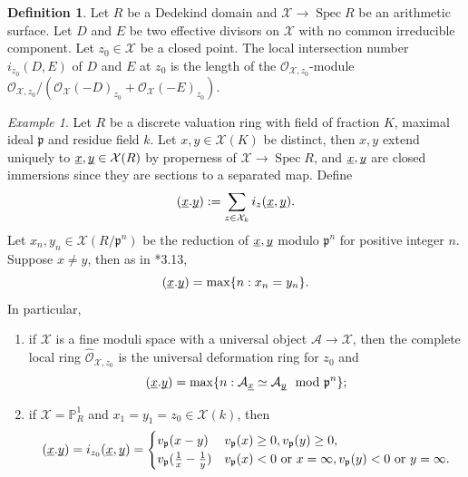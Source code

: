 \documentclass{amsart}
\numberwithin{equation}{subsection}
\numberwithin{theorem}{section}
\theoremstyle{definition}
\newtheorem{defn}[theorem]{Definition}
\theoremstyle{remark}
\newtheorem{example}[theorem]{Example}
\newcommand{\bP}{\mathbb{P}}
\newcommand{\cA}{\mathcal{A}}
\newcommand{\cO}{\mathcal{O}}
\newcommand{\cX}{\mathcal{X}}
\newcommand{\fp}{\mathfrak{p}}
\newcommand{\ul}[1]{\underline{\smash{#1}}}
\DeclareMathOperator{\Spec}{Spec}
\begin{document}
\begin{defn}
    Let $R$ be a Dedekind domain and $\mathcal{X} \to \Spec R$ be an arithmetic surface. 
    Let $D$ and $E$ be two effective divisors on $\cX$ with no common irreducible component. Let $z_0\in \mathcal{X}$ be a closed point. The local intersection number $i_{z_0}(D,E)$ of $D$ and $E$ at $z_0$ is the length of the $\cO_{\cX,z_0}$-module $\cO_{\cX, z_0} / (\cO_{\cX}(-D)_{z_0} + \cO_{\cX}(-E)_{z_0})$. 
\end{defn} 
\begin{example}
    Let $R$ be a discrete valuation ring with field of fraction $K$, maximal ideal $\fp$ and residue field $k$. Let $x,y\in \cX(K)$ be distinct, then $x,y$ extend uniquely to $\ul{x}, \ul{y} \in \cX(R)$ by properness of $\mathcal{X} \to \Spec R$, and $\ul{x}, \ul{y} $ are closed immersions since they are sections to a separated map. Define \[(\ul{x}. \ul{y}) :=  \sum_{z\in \cX_k} i_z(\ul{x}, \ul{y}).\] Let $x_n, y_n \in \cX(R/\fp^n)$ be the reduction of $\ul{x}, \ul{y}$ modulo $\fp^n$ for positive integer $n$. Suppose $x\neq y$, 
    then as in \cite{MR2705896}*{3.13}, \[(\ul{x}. \ul{y}) = \max\{n : x_n = y_n \}. \] In particular, 
    \begin{enumerate}
        \item if $\cX$ is a fine moduli space with a universal object $\cA\to \cX$, then the complete local ring $\widehat{\cO}_{\cX, z_0}$ is the universal deformation ring for $z_0$ and \[(\ul{x}. \ul{y}) = \max\{n : \cA_{\ul{x}} \simeq \cA_{\ul{y}} \mod{\fp^n} \};\]
        \item if $\cX = \bP^1_{R}$ and $x_1 = y_1 = z_0 \in \cX(k)$, then \[(\ul{x}. \ul{y}) = i_{z_0}(\ul{x}, \ul{y}) = \begin{cases}
          v_{\fp}(x-y)   & v_{\fp}(x) \geq 0 , v_{\fp}(y)\geq0,\\
          v_{\fp}(\frac{1}{x} - \frac{1}{y}) & v_{\fp}(x) <0 \text{ or }x = \infty, v_{\fp}(y) <0 \text{ or }y = \infty.
        \end{cases}\]
    \end{enumerate}
\end{example}
\end{document}
